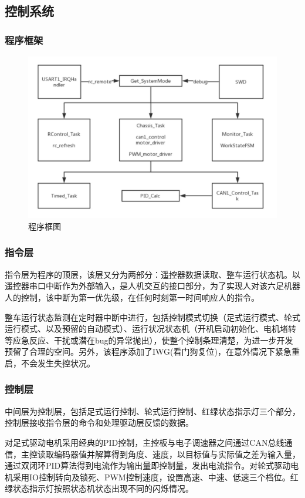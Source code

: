 \documentclass[a4paper, 11pt]{article}   %
\begin{document}
\begin{CJK}{UTF8}{gbsn}
\begin{spacing}{1.15}
\subsection{控制系统}
\subsubsection{程序框架}
 \begin{figure}[H]
\centering
\includegraphics[width=.8\textwidth]{chap5//fig6.jpg}
\caption{程序框图}
\end{figure}
\subsubsection{指令层}
指令层为程序的顶层，该层又分为两部分：遥控器数据读取、整车运行状态机。以遥控器串口中断作为外部输入，是人机交互的接口部分，为了实现人对该六足机器人的控制，该中断为第一优先级，在任何时刻第一时间响应人的指令。\par
整车运行状态监测在定时器中断中进行，包括控制模式切换（足式运行模式、轮式运行模式、以及预留的自动模式）、运行状况状态机（开机启动初始化、电机堵转等应急反应、干扰或潜在bug的异常抛出），使整个控制条理清楚，为进一步开发预留了合理的空间。另外，该程序添加了IWG(看门狗复位)，在意外情况下紧急重启，不会发生失控状况。
\subsubsection{控制层}
中间层为控制层，包括足式运行控制、轮式运行控制、红绿状态指示灯三个部分，控制层接收指令层的命令和处理驱动层反馈的数据。\par
对足式驱动电机采用经典的PID控制，主控板与电子调速器之间通过CAN总线通信，主控读取编码器值并解算得到角度、速度，以目标值与实际值之差为输入量，通过双闭环PID算法得到电流作为输出量即控制量，发出电流指令。对轮式驱动电机采用IO控制转向及锁死、PWM控制速度，设置高速、中速、低速三个档位。红绿状态指示灯按照状态机状态出现不同的闪烁情况。

\end{spacing}
\end{CJK}
\end{document}
